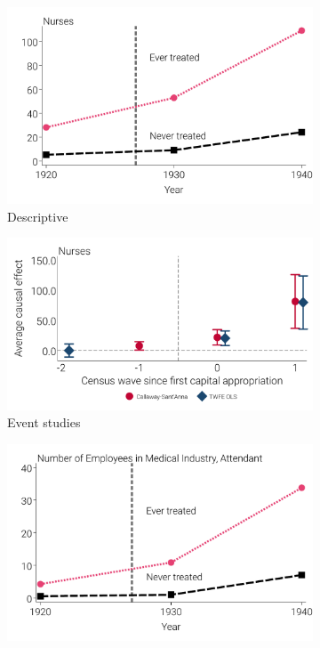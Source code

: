 \documentclass[12pt]{article}
\begin{document}
\begin{figure}[!ht]
  \caption{Employment of other health care professionals}
  \begin{minipage}{\linewidth}
  \begin{subfigure}[b]{0.49\columnwidth}
    \caption{\scriptsize{Descriptive}}
    \includegraphics[width=.9\linewidth]{../analysis/output/appendix/figure_c3a1_med_profs_by_treatment_status_nurse.pdf}
  \end{subfigure} 
  \begin{subfigure}[b]{0.49\columnwidth}
    \caption{\scriptsize{Event studies}}
    \includegraphics[width=\linewidth]{../analysis/output/appendix/figure_c3b1_event_study_hosp_staff_nurse.pdf}
    \end{subfigure}  
  \begin{subfigure}[b]{0.49\columnwidth}
    \includegraphics[width=.9\linewidth]{../analysis/output/appendix/figure_c3a2_med_profs_by_treatment_status_hosp_attendant.pdf}

\end{subfigure}
\end{minipage}
\end{figure}
\end{document}
